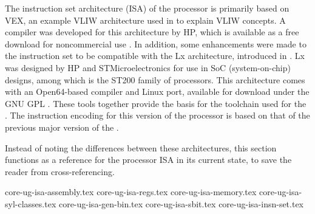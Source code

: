 
\label{sec:core-ug-isa}

The instruction set architecture (ISA) of the \rvex{} processor is primarily 
based on VEX, an example VLIW architecture used in \cite{fisher2005} to explain 
VLIW concepts. A compiler was developed for this architecture by HP, which is 
available as a free download for noncommercial use \cite{hpvex}. In addition, some 
enhancements were made to the instruction set to be compatible with the Lx 
architecture, introduced in \cite{faraboschi2000}. Lx was designed by HP and 
STMicroelectronics for use in SoC (system-on-chip) designs, among which is the 
ST200 family of processors. This architecture comes with an Open64-based 
compiler and Linux port, available for download under the GNU GPL \cite{st200}. 
These tools together provide the basis for the toolchain used for the \rvex{}. 
The instruction encoding for this version of the \rvex{} processor is based on 
that of the previous major version of the \rvex{} \cite{seedorf2010}.

Instead of noting the differences between these architectures, this section 
functions as a reference for the \rvex{} processor ISA in its current state, to 
save the reader from cross-referencing.

{core-ug-isa-assembly.tex}
{core-ug-isa-regs.tex}
{core-ug-isa-memory.tex}
{core-ug-isa-syl-classes.tex}
{core-ug-isa-gen-bin.tex}
{core-ug-isa-sbit.tex}
{core-ug-isa-insn-set.tex}





